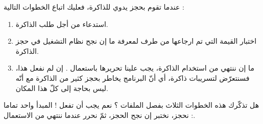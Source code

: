 عندما تقوم بحجز يدوي للذاكرة، فعليك اتباع الخطوات التالية :
\begin{enumerate}
  \item استدعاء
من أجل طلب الذاكرة.
  \item اختبار القيمة التي تم ارجاعها من طرف
لمعرفة ما إن نجح نظام التشغيل في حجز الذاكرة.
  \item ما إن ننتهي من استخدام الذاكرة، يجب علينا تحريرها باستعمال
.
إن لم نفعل هذا، فسنتعرّض لتسريبات ذاكرة، أي أنّ البرنامج يخاطر بحجز كثير من الذاكرة مع أنّه ليس بحاجة إلى كلّ هذا المكان.
\end{enumerate}

هل تذكّرك هذه الخطوات الثلاث بفصل الملفات ؟ نعم يجب أن تفعل ! المبدأ واحد تماما : نحجز، نختبر إن نجح الحجز، ثمّ نحرر عندما ننتهي من الاستعمال.
